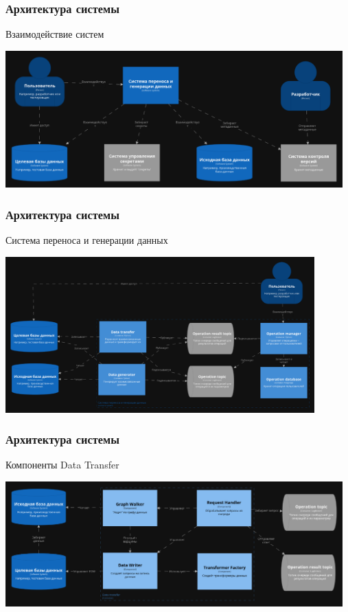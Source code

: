 \documentclass[pdf, hyperref={unicode}, aspectratio=169]{beamer}
\begin{document}
\begin{frame}
\frametitle{Архитектура системы}
	Взаимодействие систем

	\begin{center}
		\includegraphics[width = 13cm]{img/structurizr-SystemLandscape-cut}
	\end{center}
\end{frame}

\begin{frame}
\frametitle{Архитектура системы}
	Система переноса и генерации данных

	\begin{center}
		\includegraphics[height = 6cm]{img/structurizr-Containers-cut}
	\end{center}
\end{frame}


\begin{frame}
\frametitle{Архитектура системы}
	Компоненты Data Transfer

	\begin{center}
		\includegraphics[width = 13cm]{img/structurizr-DataTransferComponents-cut}
	\end{center}
\end{frame}
\end{document}
